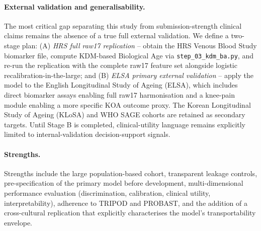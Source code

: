\documentclass[11pt,a4paper]{article}
\begin{document}
\paragraph{External validation and generalisability.}
The most critical gap separating this study from submission-strength clinical claims remains the
absence of a true full external validation. We define a two-stage plan: (A) \emph{HRS full raw17
replication} -- obtain the HRS Venous Blood Study biomarker file, compute KDM-based Biological Age
via \texttt{step\_03\_kdm\_ba.py}, and re-run the replication with the complete raw17 feature set
alongside logistic recalibration-in-the-large; and (B) \emph{ELSA primary external validation} --
apply the model to the English Longitudinal Study of Ageing (ELSA), which includes direct biomarker
assays enabling full raw17 harmonisation and a knee-pain module enabling a more specific KOA outcome
proxy. The Korean Longitudinal Study of Ageing (KLoSA) and WHO SAGE cohorts are retained as
secondary targets. Until Stage B is completed, clinical-utility language remains explicitly limited
to internal-validation decision-support signals.

\paragraph{Strengths.}
Strengths include the large population-based cohort, transparent leakage controls, pre-specification
of the primary model before development, multi-dimensional performance evaluation (discrimination,
calibration, clinical utility, interpretability), adherence to TRIPOD and PROBAST, and the addition
of a cross-cultural replication that explicitly characterises the model's transportability envelope.

\end{document}
